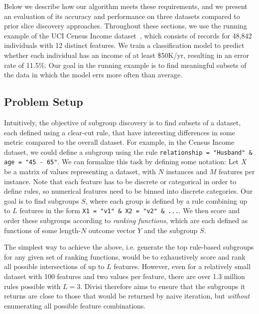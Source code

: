 Below we describe how our algorithm meets these requirements, and we present an evaluation of its accuracy and performance on three datasets compared to prior slice discovery approaches.
Throughout these sections, we use the running example of the UCI Census Income dataset~\cite{adult_2}, which consists of records for 48,842 individuals with 12 distinct features.
We train a classification model to predict whether each individual has an income of at least \$50K/yr, resulting in an error rate of 11.5\%.
Our goal in the running example is to find meaningful subsets of the data in which the model errs more often than average.

\subsection{Problem Setup}

Intuitively, the objective of subgroup discovery is to find subsets of a dataset, each defined using a clear-cut rule, that have interesting differences in some metric compared to the overall dataset.
For example, in the Census Income dataset, we could define a subgroup using the rule \texttt{relationship = "Husband" \& age = "45 - 65"}.
We can formalize this task by defining some notation: Let $X$ be a matrix of values representing a dataset, with $N$ instances and $M$ features per instance.
Note that each feature has to be discrete or categorical in order to define rules, so numerical features need to be binned into discrete categories.
Our goal is to find subgroups $S$, where each group is defined by a rule combining up to $L$ features in the form \texttt{X1 = "v1" \& X2 = "v2" \& ...}.
We then score and order these subgroups according to \textit{ranking functions}, which are each defined as functions of some length-$N$ outcome vector $Y$ and the subgroup $S$.

The simplest way to achieve the above, i.e. generate the top rule-based subgroups for any given set of ranking functions, would be to exhaustively score and rank all possible intersections of up to $L$ features.
However, even for a relatively small dataset with 100 features and two values per feature, there are over 1.3 million rules possible with $L = 3$. %
Divisi therefore aims to ensure that the subgroups it returns are close to those that would be returned by naive iteration, but \textit{without} enumerating all possible feature combinations.

